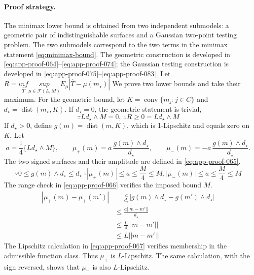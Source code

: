 \documentclass[11pt]{article}
\numberwithin{equation}{section}
\DeclareMathOperator{\dist}{dist}
\DeclareMathOperator{\conv}{conv}
\newcommand{\1}{\mathbf 1}
\newcommand{\abs}[1]{\left\lvert #1\right\rvert}
\begin{document}
\paragraph{Proof strategy.} The minimax lower bound is obtained from two independent submodels: a geometric pair of indistinguishable surfaces and a Gaussian two-point testing problem.
The two submodels correspond to the two terms in the minimax statement
\eqref{eq:minimax-bound}.  The geometric construction is developed in
\eqref{eq:app-proof-064}--\eqref{eq:app-proof-074}; the Gaussian testing
construction is developed in \eqref{eq:app-proof-075}--\eqref{eq:app-proof-083}.
Let \(R=\underset{\widehat T}{inf}\underset{\mu\in\mathcal{F}(L,M)}{sup}E_\mu\abs{\widehat T-\mu(m_\star)}\)
We prove two lower bounds and take their maximum.  For the geometric bound, let \(K=\conv\{m_j:j\in C\}\) and \(d_\star=\dist(m_\star,K)\).  If \(d_\star=0\), the geometric statement is trivial,
\begin{equation}
\label{eq:app-proof-064}
\because Ld_\star\wedge M=0,\,\therefore R\ge0=Ld_\star\wedge M
\end{equation}
If \(d_\star>0\), define \(g(m)=\dist(m,K)\), which is 1-Lipschitz and equals zero on \(K\).  Let
\begin{equation}
\label{eq:app-proof-065}
a=\frac14\{Ld_\star\wedge M\},
  \qquad
  \mu_+(m)=a\,\frac{g(m)\wedge d_\star}{d_\star},
  \qquad
  \mu_-(m)=-a\,\frac{g(m)\wedge d_\star}{d_\star}.
\end{equation}
The two signed surfaces and their amplitude are defined in
\eqref{eq:app-proof-065}.
\begin{equation}
\label{eq:app-proof-066}
\because 0\le g(m)\wedge d_\star\le d_\star\,\therefore\abs{\mu_+(m)}\le a\le\frac{M}4\le M,\abs{\mu_-(m)}\le a\le\frac{M}4\le M
\end{equation}
The range check in \eqref{eq:app-proof-066} verifies the imposed bound \(M\).
\begin{equation}
\label{eq:app-proof-067}
\begin{aligned}
\abs{\mu_+(m)-\mu_+(m')}
&=\frac a{d_\star}\abs{g(m)\wedge d_\star-g(m')\wedge d_\star}\\
&\le \frac{a||m-m'||}{d_\star}\\
&\le \frac L4 ||m-m'||\\
&\le L||m-m'||
\end{aligned}
\end{equation}
The Lipschitz calculation in \eqref{eq:app-proof-067} verifies membership in
the admissible function class.
Thus \(\mu_+\) is \(L\)-Lipschitz.  The same calculation, with the sign reversed, shows that \(\mu_-\) is also \(L\)-Lipschitz.
\end{document}
